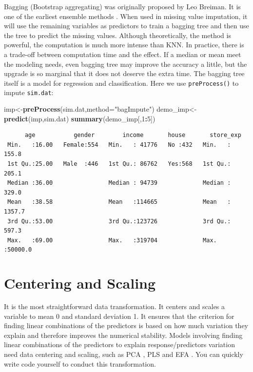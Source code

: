 \documentclass[12pt,]{krantz}
\newenvironment{Shaded}{\begin{snugshade}}{\end{snugshade}}
\newcommand{\KeywordTok}[1]{\textcolor[rgb]{0.13,0.29,0.53}{\textbf{#1}}}
\newcommand{\DataTypeTok}[1]{\textcolor[rgb]{0.13,0.29,0.53}{#1}}
\newcommand{\DecValTok}[1]{\textcolor[rgb]{0.00,0.00,0.81}{#1}}
\newcommand{\StringTok}[1]{\textcolor[rgb]{0.31,0.60,0.02}{#1}}
\newcommand{\OperatorTok}[1]{\textcolor[rgb]{0.81,0.36,0.00}{\textbf{#1}}}
\newcommand{\NormalTok}[1]{#1}
\theoremstyle{definition}
\theoremstyle{definition}
\theoremstyle{definition}
\theoremstyle{remark}
\begin{document}
Bagging (Bootstrap aggregating) was originally proposed by Leo Breiman.
It is one of the earliest ensemble methods \citep{bag1}. When used in
missing value imputation, it will use the remaining variables as
predictors to train a bagging tree and then use the tree to predict the
missing values. Although theoretically, the method is powerful, the
computation is much more intense than KNN. In practice, there is a
trade-off between computation time and the effect. If a median or mean
meet the modeling needs, even bagging tree may improve the accuracy a
little, but the upgrade is so marginal that it does not deserve the
extra time. The bagging tree itself is a model for regression and
classification. Here we use \texttt{preProcess()} to impute
\texttt{sim.dat}:

\begin{Shaded}
\begin{Highlighting}[]
\NormalTok{imp<-}\KeywordTok{preProcess}\NormalTok{(sim.dat,}\DataTypeTok{method=}\StringTok{"bagImpute"}\NormalTok{)}
\NormalTok{demo_imp<-}\KeywordTok{predict}\NormalTok{(imp,sim.dat)}
\KeywordTok{summary}\NormalTok{(demo_imp[,}\DecValTok{1}\OperatorTok{:}\DecValTok{5}\NormalTok{])}
\end{Highlighting}
\end{Shaded}

\begin{verbatim}
      age           gender        income       house       store_exp      
 Min.   :16.00   Female:554   Min.   : 41776   No :432   Min.   :  155.8  
 1st Qu.:25.00   Male  :446   1st Qu.: 86762   Yes:568   1st Qu.:  205.1  
 Median :36.00                Median : 94739             Median :  329.0  
 Mean   :38.58                Mean   :114665             Mean   : 1357.7  
 3rd Qu.:53.00                3rd Qu.:123726             3rd Qu.:  597.3  
 Max.   :69.00                Max.   :319704             Max.   :50000.0  
\end{verbatim}

\section{Centering and Scaling}\label{centering-and-scaling}

It is the most straightforward data transformation. It centers and
scales a variable to mean 0 and standard deviation 1. It ensures that
the criterion for finding linear combinations of the predictors is based
on how much variation they explain and therefore improves the numerical
stability. Models involving finding linear combinations of the
predictors to explain response/predictors variation need data centering
and scaling, such as PCA \citep{pca1}, PLS \citep{PLS1} and EFA
\citep{EFA1}. You can quickly write code yourself to conduct this
transformation.
\end{document}
